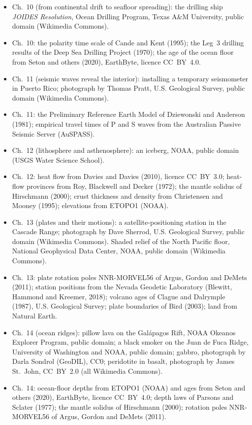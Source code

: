 \begin{itemize}
  \item Ch.~10 (from continental drift to seafloor spreading): the drilling ship \emph{JOIDES Resolution}, Ocean Drilling Program, Texas A\&M University, public domain (Wikimedia Commons).
  \item Ch.~10: the polarity time scale of Cande and Kent (1995); the Leg~3 drilling results of the Deep Sea Drilling Project (1970); the age of the ocean floor from Seton and others (2020), EarthByte, licence CC~BY~4.0.
  \item Ch.~11 (seismic waves reveal the interior): installing a temporary seismometer in Puerto Rico; photograph by Thomas Pratt, U.S. Geological Survey, public domain (Wikimedia Commons).
  \item Ch.~11: the Preliminary Reference Earth Model of Dziewonski and Anderson (1981); empirical travel times of P and S waves from the Australian Passive Seismic Server (AuSPASS).
  \item Ch.~12 (lithosphere and asthenosphere): an iceberg, NOAA, public domain (USGS Water Science School).
  \item Ch.~12: heat flow from Davies and Davies (2010), licence CC~BY~3.0; heat-flow provinces from Roy, Blackwell and Decker (1972); the mantle solidus of Hirschmann (2000); crust thickness and density from Christensen and Mooney (1995); elevations from ETOPO1 (NOAA).
  \item Ch.~13 (plates and their motions): a satellite-positioning station in the Cascade Range; photograph by Dave Sherrod, U.S. Geological Survey, public domain (Wikimedia Commons). Shaded relief of the North Pacific floor, National Geophysical Data Center, NOAA, public domain (Wikimedia Commons).
  \item Ch.~13: plate rotation poles NNR-MORVEL56 of Argus, Gordon and DeMets (2011); station positions from the Nevada Geodetic Laboratory (Blewitt, Hammond and Kreemer, 2018); volcano ages of Clague and Dalrymple (1987), U.S. Geological Survey; plate boundaries of Bird (2003); land from Natural Earth.
  \item Ch.~14 (ocean ridges): pillow lava on the Galápagos Rift, NOAA Okeanos Explorer Program, public domain; a black smoker on the Juan de Fuca Ridge, University of Washington and NOAA, public domain; gabbro, photograph by Darla Sondrol (GeoDIL), CC0; peridotite in basalt, photograph by James St.~John, CC~BY~2.0 (all Wikimedia Commons).
  \item Ch.~14: ocean-floor depths from ETOPO1 (NOAA) and ages from Seton and others (2020), EarthByte, licence CC~BY~4.0; depth laws of Parsons and Sclater (1977); the mantle solidus of Hirschmann (2000); rotation poles NNR-MORVEL56 of Argus, Gordon and DeMets (2011).

\end{itemize}
